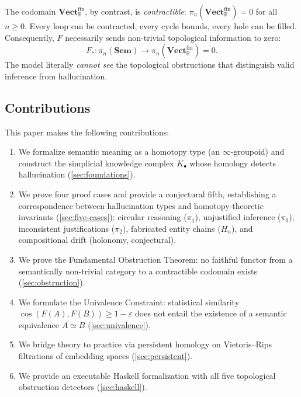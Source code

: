 \documentclass[11pt,a4paper]{article}
\theoremstyle{plain}
\theoremstyle{definition}
\theoremstyle{remark}
\newcommand{\Sem}{\mathbf{Sem}}
\newcommand{\Vect}{\mathbf{Vect}}
\newcommand{\R}{\mathbb{R}}
\begin{document}
The codomain $\Vect_{\R}^{\mathrm{fin}}$, by contrast, is \emph{contractible}: $\pi_n(\Vect_{\R}^{\mathrm{fin}}) = 0$ for all $n \geq 0$. Every loop can be contracted, every cycle bounds, every hole can be filled. Consequently, $F$ necessarily sends non-trivial topological information to zero:
\begin{equation}
F_*: \pi_n(\Sem) \to \pi_n(\Vect_{\R}^{\mathrm{fin}}) = 0.
\end{equation}
The model literally \emph{cannot see} the topological obstructions that distinguish valid inference from hallucination.

\subsection{Contributions}

This paper makes the following contributions:

\begin{enumerate}[nosep]
  \item We formalize semantic meaning as a homotopy type (an $\infty$-groupoid) and construct the simplicial knowledge complex $K_\bullet$ whose homology detects hallucination (\cref{sec:foundations}).

  \item We prove four proof cases and provide a conjectural fifth, establishing a correspondence between hallucination types and homotopy-theoretic invariants (\cref{sec:five-cases}): circular reasoning ($\pi_1$), unjustified inference ($\pi_0$), inconsistent justifications ($\pi_2$), fabricated entity chains ($H_n$), and compositional drift (holonomy, conjectural).

  \item We prove the Fundamental Obstruction Theorem: no faithful functor from a semantically non-trivial category to a contractible codomain exists (\cref{sec:obstruction}).

  \item We formulate the Univalence Constraint: statistical similarity $\cos(F(A), F(B)) \geq 1 - \varepsilon$ does not entail the existence of a semantic equivalence $A \simeq B$ (\cref{sec:univalence}).

  \item We bridge theory to practice via persistent homology on Vietoris--Rips filtrations of embedding spaces (\cref{sec:persistent}).

  \item We provide an executable Haskell formalization with all five topological obstruction detectors (\cref{sec:haskell}).
\end{enumerate}
\end{document}
